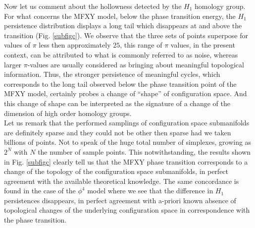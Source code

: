 \documentclass[preprintnumbers,showpacs, showkeys, twocolumn,secnumarabic,amssymb,amsmath,amsfonts,aps, pre]{revtex4-1}
\begin{document}
Now let us comment about the hollowness { detected by} the $H_1$ homology group.
For what concerns the MFXY model, below the phase transition energy, the $H_1$ persistence distribution displays a long tail which disappears at and above the transition (Fig. \ref{subfigc}). 
We observe that the three sets of points superpose for values of $\pi$ less then approximately $25$,
this range of $\pi$ values, in the present context, can be attributed to what is commonly referred to as noise, whereas larger $\pi$-values are usually considered as bringing about meaningful topological information. Thus, the stronger persistence of meaningful cycles, which corresponds to the long tail observed below the phase transition point of the MFXY model, certainly probes a change of ``shape'' of configuration space. And this change of shape can be interpreted as the signature of a change of the dimension of high order homology groups. \\
Let us remark that the performed samplings of configuration space submanifolds are definitely sparse and they could not be other then sparse had we taken billions of points. Not to speak of the huge total number of simplexes, growing as $2^N$ with $N$ the number of sample points.
This notwithstanding, the results shown in Fig. \ref{subfigc} clearly tell us that the MFXY phase transition corresponds to a change of the topology of the configuration space submanifolds, in perfect agreement with the available theoretical knowledge.
The same concordance is found in the case of the $\phi^4$ model where we see that the difference in $H_1$ persistences disappears, in perfect agreement with a-priori known absence of topological changes of the underlying configuration space in correspondence with the phase transition.
\end{document}
